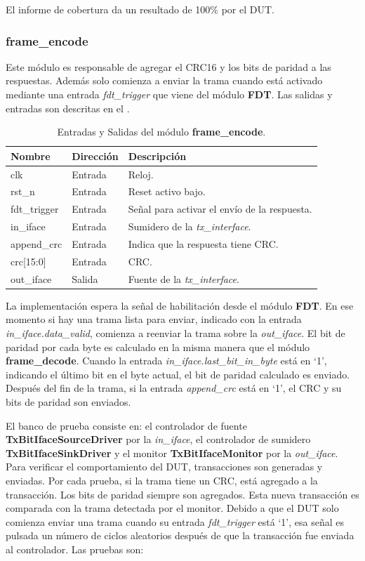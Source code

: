 \documentclass[a4paper, twoside, 11pt]{report}
\begin{document}
El informe de cobertura da un resultado de 100\% por el DUT.

\FloatBarrier
\subsubsection{frame\_encode}

Este módulo es responsable de agregar el CRC16 y los bits de paridad a las respuestas. Además solo comienza a enviar la trama cuando está activado mediante una entrada \textit{fdt\_trigger} que viene del módulo \textbf{FDT}. Las salidas y entradas son descritas en el .

\begin{table}[htb]
  \centering
  \tablezebra
  \begin{tabulary}{\linewidth}{l|l|L}
    \setcounter{rownum}{0}
    \textbf{Nombre}&\textbf{Dirección}&\textbf{Descripción} \\
    \hline
    clk&Entrada&Reloj. \\
    rst\_n&Entrada&Reset activo bajo. \\
    fdt\_trigger&Entrada&Señal para activar el envío de la respuesta. \\
    in\_iface&Entrada&Sumidero de la \textit{tx\_interface}. \\
    append\_crc&Entrada&Indica que la respuesta tiene CRC. \\
    crc[15:0]&Entrada&CRC. \\
    out\_iface&Salida&Fuente de la \textit{tx\_interface}. \\
  \end{tabulary}
  \caption{Entradas y Salidas del módulo \textbf{frame\_encode}.}
  \label{tab:ports_frame_encode}
\end{table}

La implementación espera la señal de habilitación desde el módulo \textbf{FDT}. En ese momento si hay una trama lista para enviar, indicado con la entrada \textit{in\_iface.data\_valid}, comienza a reenviar la trama sobre la \textit{out\_iface}. El bit de paridad por cada byte es calculado en la misma manera que el módulo \textbf{frame\_decode}. Cuando la entrada \textit{in\_iface.last\_bit\_in\_byte} está en ‘1’, indicando el último bit en el byte actual, el bit de paridad calculado es enviado. Después del fin de la trama, si la entrada \textit{append\_crc} está en ‘1’, el CRC y su bits de paridad son enviados.

El banco de prueba consiste en: el controlador de fuente \textbf{TxBitIfaceSourceDriver} por la \textit{in\_iface}, el controlador de sumidero \textbf{TxBitIfaceSinkDriver} y el monitor \textbf{TxBitIfaceMonitor} por la \textit{out\_iface}. Para verificar el comportamiento del DUT, transacciones son generadas y enviadas. Por cada prueba, si la trama tiene un CRC, está agregado a la transacción. Los bits de paridad siempre son agregados. Esta nueva transacción es comparada con la trama detectada por el monitor. Debido a que el DUT solo comienza enviar una trama cuando su entrada \textit{fdt\_trigger} está ‘1’, esa señal es pulsada un número de ciclos aleatorios después de que la transacción fue enviada al controlador. Las pruebas son:
\end{document}
